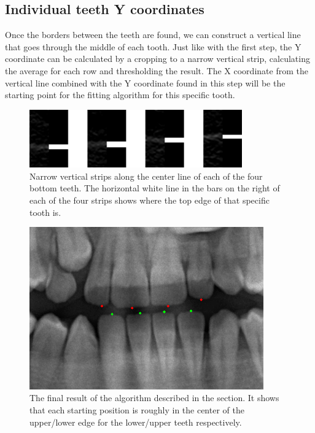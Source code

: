 \documentclass[a4paper,10pt]{article}
\begin{document}
\subsection{Individual teeth Y coordinates}
Once the borders between the teeth are found, we can construct a vertical line that goes through the middle of each tooth. Just like with the first step, the Y coordinate can be calculated by a cropping to a narrow vertical strip, calculating the average for each row and thresholding the result. The X coordinate from the vertical line combined with the Y coordinate found in this step will be the starting point for the fitting algorithm for this specific tooth.

\begin{figure}[]
\centering
\includegraphics[height=25mm]{teeth_vertical_individual.png}
 \caption{Narrow vertical strips along the center line of each of the four bottom teeth. The horizontal white line in the bars on the right of each of the four strips shows where the top edge of that specific tooth is.}
\end{figure}
 


\begin{figure}[]
\centering
\includegraphics[height=70mm]{starting_positions.png}
 \caption{The final result of the algorithm described in the section. It shows that each starting position is roughly in the center of the upper/lower edge for the lower/upper teeth respectively.}
\end{figure}

\newpage
\end{document}
